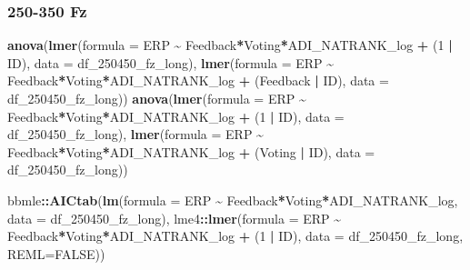\documentclass[
]{article}
\newenvironment{Shaded}{\begin{snugshade}}{\end{snugshade}}
\newcommand{\AttributeTok}[1]{\textcolor[rgb]{0.13,0.29,0.53}{#1}}
\newcommand{\ConstantTok}[1]{\textcolor[rgb]{0.56,0.35,0.01}{#1}}
\newcommand{\DecValTok}[1]{\textcolor[rgb]{0.00,0.00,0.81}{#1}}
\newcommand{\FunctionTok}[1]{\textcolor[rgb]{0.13,0.29,0.53}{\textbf{#1}}}
\newcommand{\NormalTok}[1]{#1}
\newcommand{\OtherTok}[1]{\textcolor[rgb]{0.56,0.35,0.01}{#1}}
\newcommand{\SpecialCharTok}[1]{\textcolor[rgb]{0.81,0.36,0.00}{\textbf{#1}}}
\newcommand{\StringTok}[1]{\textcolor[rgb]{0.31,0.60,0.02}{#1}}
\begin{document}
\begin{Shaded}
\end{Shaded}

\hypertarget{fz}{%
\subsubsection{250-350 Fz}\label{fz}}

\begin{Shaded}
\begin{Highlighting}[]
\FunctionTok{anova}\NormalTok{(}\FunctionTok{lmer}\NormalTok{(}\AttributeTok{formula =}\NormalTok{ ERP }\SpecialCharTok{\textasciitilde{}}\NormalTok{ Feedback}\SpecialCharTok{*}\NormalTok{Voting}\SpecialCharTok{*}\NormalTok{ADI\_NATRANK\_log }\SpecialCharTok{+}\NormalTok{ (}\DecValTok{1} \SpecialCharTok{|}\NormalTok{ ID), }\AttributeTok{data =}\NormalTok{ df\_250450\_fz\_long),}
      \FunctionTok{lmer}\NormalTok{(}\AttributeTok{formula =}\NormalTok{ ERP }\SpecialCharTok{\textasciitilde{}}\NormalTok{ Feedback}\SpecialCharTok{*}\NormalTok{Voting}\SpecialCharTok{*}\NormalTok{ADI\_NATRANK\_log }\SpecialCharTok{+}\NormalTok{ (Feedback }\SpecialCharTok{|}\NormalTok{ ID), }\AttributeTok{data =}\NormalTok{ df\_250450\_fz\_long))}
\FunctionTok{anova}\NormalTok{(}\FunctionTok{lmer}\NormalTok{(}\AttributeTok{formula =}\NormalTok{ ERP }\SpecialCharTok{\textasciitilde{}}\NormalTok{ Feedback}\SpecialCharTok{*}\NormalTok{Voting}\SpecialCharTok{*}\NormalTok{ADI\_NATRANK\_log }\SpecialCharTok{+}\NormalTok{ (}\DecValTok{1} \SpecialCharTok{|}\NormalTok{ ID), }\AttributeTok{data =}\NormalTok{ df\_250450\_fz\_long),}
      \FunctionTok{lmer}\NormalTok{(}\AttributeTok{formula =}\NormalTok{ ERP }\SpecialCharTok{\textasciitilde{}}\NormalTok{ Feedback}\SpecialCharTok{*}\NormalTok{Voting}\SpecialCharTok{*}\NormalTok{ADI\_NATRANK\_log }\SpecialCharTok{+}\NormalTok{ (Voting }\SpecialCharTok{|}\NormalTok{ ID), }\AttributeTok{data =}\NormalTok{ df\_250450\_fz\_long))}

\NormalTok{bbmle}\SpecialCharTok{::}\FunctionTok{AICtab}\NormalTok{(}\FunctionTok{lm}\NormalTok{(}\AttributeTok{formula =}\NormalTok{ ERP }\SpecialCharTok{\textasciitilde{}}\NormalTok{ Feedback}\SpecialCharTok{*}\NormalTok{Voting}\SpecialCharTok{*}\NormalTok{ADI\_NATRANK\_log, }\AttributeTok{data =}\NormalTok{ df\_250450\_fz\_long),}
\NormalTok{      lme4}\SpecialCharTok{::}\FunctionTok{lmer}\NormalTok{(}\AttributeTok{formula =}\NormalTok{ ERP }\SpecialCharTok{\textasciitilde{}}\NormalTok{ Feedback}\SpecialCharTok{*}\NormalTok{Voting}\SpecialCharTok{*}\NormalTok{ADI\_NATRANK\_log }\SpecialCharTok{+}\NormalTok{ (}\DecValTok{1} \SpecialCharTok{|}\NormalTok{ ID), }\AttributeTok{data =}\NormalTok{ df\_250450\_fz\_long, }\AttributeTok{REML=}\ConstantTok{FALSE}\NormalTok{))}


\end{Highlighting}
\end{Shaded}
\end{document}
